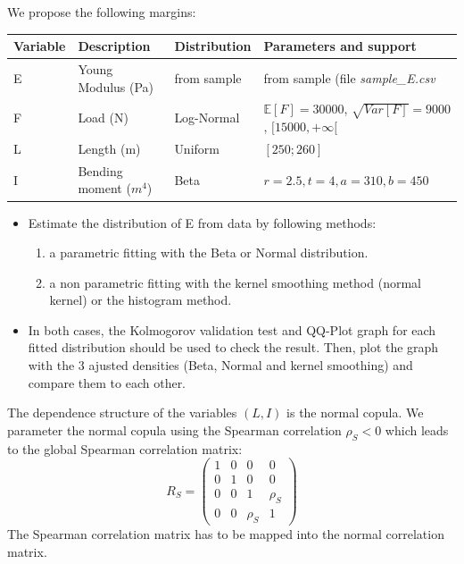 \documentclass[11pt, french, A4wide]{article}
\theoremstyle{remark}
\theoremstyle{definition}
\begin{document}
We propose the following margins:

\begin{table}[h!]
	\begin{tabular}{|l|l|l|l|}
	\hline
	Variable & Description            & Distribution & Parameters and support                  \\ \hline
	E        & Young Modulus (Pa)     & from sample  & from sample (file \emph{sample\_E.csv}  \\ \hline
	F        & Load (N)               & Log-Normal   & $\mathbb{E}[F] = 30000$, $\sqrt{Var[F]} = 9000$, $[15000, +\infty[$   \\ \hline
	L        & Length (m)             & Uniform      & $[250; 260]$            				   \\ \hline
	I        & Bending moment ($m^4$) & Beta         & $r = 2.5,t = 4,a = 310,b = 450$         \\ \hline      
	\end{tabular}
\end{table}

\vspace*{0.2cm}

\begin{itemize}
 	\item Estimate the distribution of E from data by following methods:
  	\begin{enumerate}
		\item a parametric fitting with the Beta or Normal distribution. 
     	\item a non parametric fitting with the kernel smoothing method (normal kernel) or the histogram method.
   \end{enumerate}
   \item In both cases, the Kolmogorov validation test and QQ-Plot graph for each fitted distribution should be used to check the result. Then, plot the graph with the 3 ajusted densities (Beta, Normal and kernel smoothing) and compare them to each other.
\end{itemize}


\vspace*{0.2cm}

The dependence structure of the variables $(L,I)$ is the normal copula. We parameter the normal copula using the Spearman correlation $\rho_S<0$ which leads to the global Spearman correlation matrix:
$$
R_S = \left (
\begin{array}{cccc}
  1 & 0 & 0 & 0 \\
  0 & 1 & 0 & 0 \\
  0 & 0 & 1 & \rho_S \\
  0 & 0 & \rho_S & 1
\end{array}
\right)
$$
The Spearman correlation matrix has to be mapped into the normal correlation matrix.\\
\end{document}
